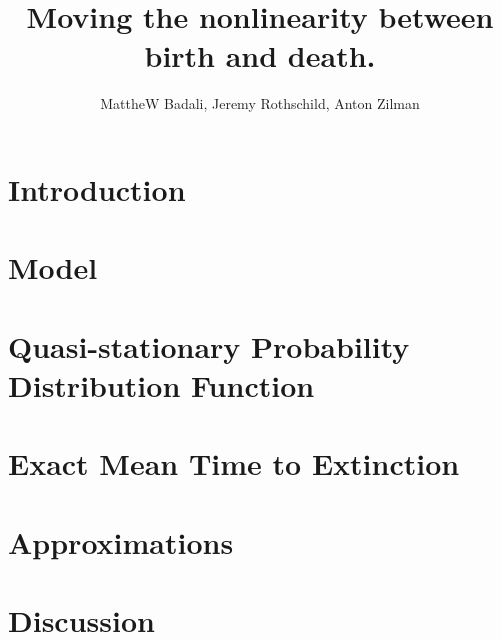 \documentclass[a4paper,10pt]{article}
\title{Moving the nonlinearity between birth and death.}
\author{MattheW Badali, Jeremy Rothschild, Anton Zilman}
\numberwithin{equation}{section} %
\begin{document}
\maketitle



\section{Introduction}



\section{Model}



\section{Quasi-stationary Probability Distribution Function}



\section{Exact Mean Time to Extinction}%



\section{Approximations}



\section{Discussion}





\end{document}
